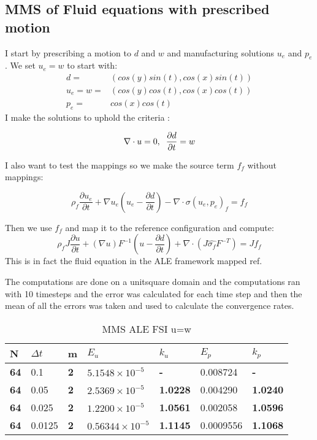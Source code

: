 \subsection{MMS of Fluid equations with prescribed motion}
I start by prescribing a motion to $ d$ and $w$ and manufacturing solutions $u_e$ and $p_e$. We set $u_e = w$ to start with:
\begin{align*}
d =& ( cos(y)sin(t) , cos(x)sin(t) )\\
u_e = w=& ( cos(y)cos(t), cos(x)cos(t) ) \\
p_e =& cos(x)cos(t)
\end{align*}
I make the solutions to uphold the criteria : 

$$ \nabla \cdot u =0  ,\hspace{2mm} \frac{\partial d}{\partial t} = w  $$

I also want to test the mappings so we make the source term $f_f$ without mappings:

$$ \rho_f \frac{\partial u_e}{\partial t}  +  \nabla u_e (u_e - \frac{\partial d}{\partial t})  -  \nabla \cdot \sigma(u_e,p_e)_f  = f_f $$

Then we use $f_f$ and map it to the reference configuration and compute:
$$ \rho_f J \frac{\partial u}{\partial t} + (\nabla u)F^{-1}(u-\frac{\partial d}{\partial t})  + \nabla \cdot( J \hat{\sigma_f} F^{-T}) = J f_f$$
This is in fact the fluid equation in the ALE framework mapped ref.

The computations are done on a unitsquare domain and the computations ran with 10 timesteps and the error was calculated for each time step and then the mean of all the errors was taken and used to calculate the convergence rates.

\begin{table}[H]
\centering
\caption{MMS ALE FSI u=w}
\label{my-label}
\begin{tabular}{|l|l|l|l|l|l|l|}
\hline
\textbf{N} & $\Delta t$ & \textbf{m} & $E_u$ & \textbf{$k_u$} & $E_p$ & \textbf{$k_p$} \\ \hline
\textbf{64} & 0.1 & \textbf{2} & $5.1548 \times 10^{-5}$ & \textbf{-} & 0.008724 & \textbf{-} \\ \hline
\textbf{64} & 0.05 & \textbf{2} & $2.5369 \times 10^{-5}$ & \textbf{1.0228} & 0.004290 & \textbf{1.0240} \\ \hline
\textbf{64} & 0.025 & \textbf{2} & $1.2200 \times 10^{-5}$ & \textbf{1.0561} & 0.002058 & \textbf{1.0596} \\ \hline
\textbf{64} & 0.0125 & \textbf{2} & $0.56344 \times 10^{-5}$ & \textbf{1.1145} & 0.0009556 & \textbf{1.1068} \\ \hline
\end{tabular}
\end{table}

